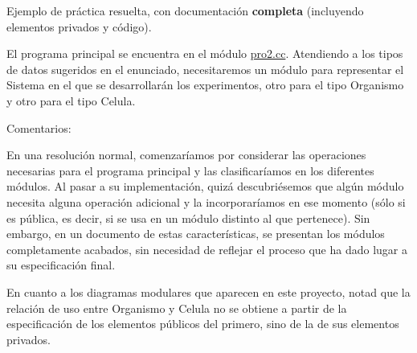 Ejemplo de práctica resuelta, con documentación {\bfseries  completa} (incluyendo elementos privados y código).

El programa principal se encuentra en el módulo \hyperlink{pro2_8cc}{pro2.\+cc}. Atendiendo a los tipos de datos sugeridos en el enunciado, necesitaremos un módulo para representar el Sistema en el que se desarrollarán los experimentos, otro para el tipo Organismo y otro para el tipo Celula.

Comentarios\+:


\begin{DoxyItemize}
\item En una resolución normal, comenzaríamos por considerar las operaciones necesarias para el programa principal y las clasificaríamos en los diferentes módulos. Al pasar a su implementación, quizá descubriésemos que algún módulo necesita alguna operación adicional y la incorporaríamos en ese momento (sólo si es pública, es decir, si se usa en un módulo distinto al que pertenece). Sin embargo, en un documento de estas características, se presentan los módulos completamente acabados, sin necesidad de reflejar el proceso que ha dado lugar a su especificación final.
\item En cuanto a los diagramas modulares que aparecen en este proyecto, notad que la relación de uso entre Organismo y Celula no se obtiene a partir de la especificación de los elementos públicos del primero, sino de la de sus elementos privados. 
\end{DoxyItemize}